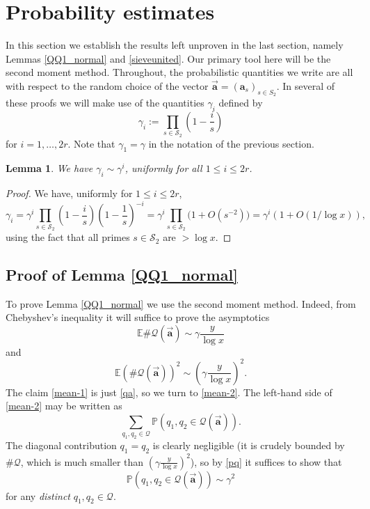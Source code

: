 \documentclass[11pt]{amsart}
\numberwithin{equation}{section}  %
\theoremstyle{remark}
\theoremstyle{plain}
\newtheorem{lem}{Lemma}[section]
\numberwithin{equation}{section}
\newcommand{\E}{\mathbb{E}}  %
\newcommand{\PR}{\mathbb{P}}  %
\newcommand{\g}{\gamma}
\renewcommand{\leq}{\leqslant}
\renewcommand{\(}{\left(}
\renewcommand{\)}{\right)}
\newcommand{\asym}{\sim}   %
\newcommand{\vect}[1]{{\ensuremath{\vec{#1}}}}
\newcommand{\QQ}{\mathcal{Q}}
\newcommand{\cS}{\mathcal{S}}
\begin{document}
%
\section{Probability estimates}\label{sec:prob}
%

In this section we establish the results left unproven in the last
section, namely Lemmas \ref{QQ1_normal} and \ref{sieveunited}.  Our primary tool here will be the second moment method.  Throughout, 
the probabilistic quantities we write are
all with respect to the random choice of the vector
$\vect{\mathbf{a}}=(\mathbf{a}_s)_{s\in S_2}$.
In several of these proofs we will make use of the quantities $\gamma_i$ defined by
\begin{equation}\label{gammai-def}
\gamma_i:=\prod_{s\in \cS_2} \left(1-\frac is\right)
\end{equation}
for $i = 1,\dots, 2r$. Note that $\gamma_1 = \gamma$ in the notation of the previous section.

\begin{lem}\label{gam-bounds}
We have $\gamma_i \asym \gamma^i$, uniformly for all $1 \leq i \leq 2r$.

\end{lem}
\begin{proof} We have, uniformly for $1 \leq i \leq 2r$,
\[
\gamma_i=\gamma^{i}\prod_{s\in \cS_2} \left(1-\frac is\right)
\left(1-\frac 1s\right)^{-i}
=\g^i\prod_{s\in \cS_2}\big(1+O(s^{-2})\big)
=\g^i(1+O(1/\log x)),
\]
using the fact that all primes $s \in \cS_2$ are $> \log x$.
\end{proof}

\subsection{Proof of Lemma \ref{QQ1_normal}}

To prove Lemma \ref{QQ1_normal} we use the second moment method.  Indeed, from Chebyshev's inequality it will suffice to prove the asymptotics
\begin{equation}\label{mean-1}
\E \# \QQ(\vect{\mathbf{a}}) \asym \gamma \frac{y}{\log x}
\end{equation}
and
\begin{equation}\label{mean-2}
\E (\# \QQ(\vect{\mathbf{a}}))^2 \asym \left(\gamma \frac{y}{\log x}\right)^2.
\end{equation}
The claim \eqref{mean-1} is just \eqref{qa}, so we turn to \eqref{mean-2}. 
The left-hand side of \eqref{mean-2} may be written as
$$  \sum_{q_1, q_2 \in \QQ} \PR( q_1,q_2 \in \QQ(\vect{\mathbf{a}}) ).$$
The diagonal contribution $q_1=q_2$ is clearly negligible (it is crudely bounded by $\# \QQ$, which is much smaller than $\left(\gamma \frac{y}{\log x}\right)^2$), so by \eqref{pq} it suffices to show that
$$ \PR( q_1,q_2 \in \QQ(\vect{\mathbf{a}}) ) \asym \gamma^2$$
for any \emph{distinct} $q_1, q_2 \in \QQ$.
\end{document}
